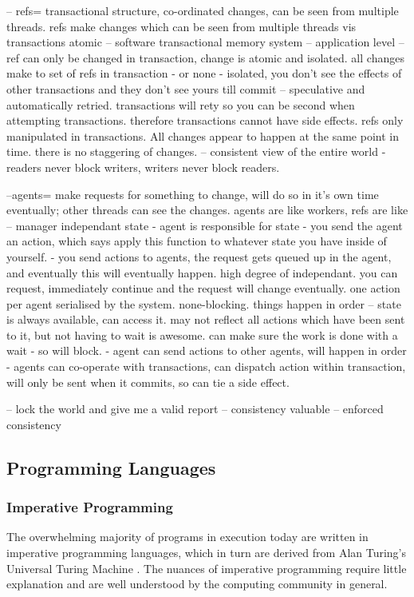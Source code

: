 \documentclass[12pt,a4paper]{article}
\begin{document}
-- refs= transactional structure, co-ordinated changes, can be seen from multiple threads. refs make changes which can be seen from multiple threads vis transactions atomic
-- software transactional memory system -- application level -- ref can only be changed in transaction, change is atomic and isolated. all changes make to set of refs in transaction - or none - isolated, you don't see the effects of other transactions and they don't see yours till commit -- speculative and automatically retried. transactions will rety so you can be second when attempting transactions. therefore transactions cannot have side effects. refs only manipulated in transactions. All changes appear to happen at the same point in time. there is no staggering of changes. -- consistent view of the entire world - readers never block writers, writers never block readers.


--agents= make requests for something to change, will do so in it's own time eventually; other threads can see the changes. agents are like workers, refs are like
-- manager independant state - agent is responsible for state - you send the agent an action, which says apply this function to whatever state you have inside of yourself.
- you send actions to agents, the request gets queued up in the agent, and eventually this will eventually happen. high degree of independant. you can request, immediately continue and the request will change eventually. one action per agent serialised by the system. none-blocking. things happen in order -- state is always available, can access it. may not reflect all actions which have been sent to it, but not having to wait is awesome. can make sure the work is done with a wait - so will block. - agent can send actions to other agents, will happen in order - agents can co-operate with transactions, can dispatch action within transaction, will only be sent when it commits, so can tie a side effect.

-- lock the world and give me a valid report -- consistency valuable  -- enforced consistency


\subsection{Programming Languages}

\subsubsection{Imperative Programming}

The overwhelming majority of programs in execution today are written in imperative programming languages, which in turn are derived from Alan Turing's Universal Turing Machine \cite{turing1936,ImperativeFunctional}. The nuances of imperative programming require little explanation and are well understood by the computing community in general.
\end{document}
